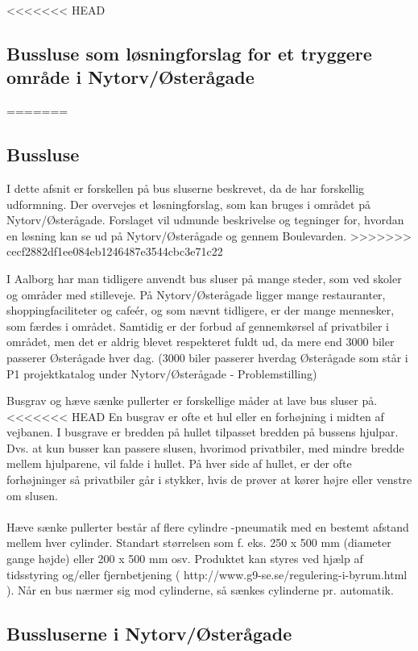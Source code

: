 <<<<<<< HEAD
\subsection{Bussluse som løsningforslag for et tryggere område i Nytorv/Østerågade}
\label{bussluselosningforslag}
=======
\subsection{Bussluse}
\label{bussluse}

I dette afsnit er forskellen på bus sluserne beskrevet, da de har forskellig udformning. Der overvejes et løsningforslag, som kan bruges i området på Nytorv/Østerågade. Forslaget vil udmunde beskrivelse og tegninger for, hvordan en løsning kan se ud på Nytorv/Østerågade og gennem Boulevarden.
>>>>>>> cecf2882df1ee084eb1246487e3544cbc3e71c22

I Aalborg har man tidligere anvendt bus sluser på mange steder, som ved skoler og områder med stilleveje. På Nytorv/Østerågade ligger mange restauranter, shoppingfaciliteter og cafeér, og som nævnt tidligere, er der mange mennesker, som færdes i området. Samtidig er der forbud af gennemkørsel af privatbiler i området, men det er aldrig blevet respekteret fuldt ud, da mere end 3000 biler passerer Østerågade hver dag. (3000 biler passerer hverdag Østerågade som står i P1 projektkatalog under Nytorv/Østerågade - Problemstilling)

Busgrav og hæve sænke pullerter er forskellige måder at lave bus sluser på.
<<<<<<< HEAD
En busgrav er ofte et hul eller en forhøjning i midten af vejbanen. I busgrave er bredden på hullet tilpasset bredden på bussens hjulpar. Dvs. at kun busser kan passere slusen, hvorimod privatbiler, med mindre bredde mellem hjulparene, vil falde i hullet. På hver side af hullet, er der ofte forhøjninger så privatbiler går i stykker, hvis de prøver at kører højre eller venstre om slusen. 
\\\\
Hæve sænke pullerter består af flere cylindre -pneumatik med en bestemt afstand mellem hver cylinder. Standart størrelsen som f. eks. 250 x 500 mm (diameter gange højde) eller 200 x 500 mm osv. Produktet kan styres ved hjælp af tidsstyring og/eller fjernbetjening ( http://www.g9-se.se/regulering-i-byrum.html ). Når en bus nærmer sig mod cylinderne, så sænkes cylinderne pr. automatik. 


        


\subsection{Bussluserne i Nytorv/Østerågade}
\label{bussluseinytorv}                                           
                                           
